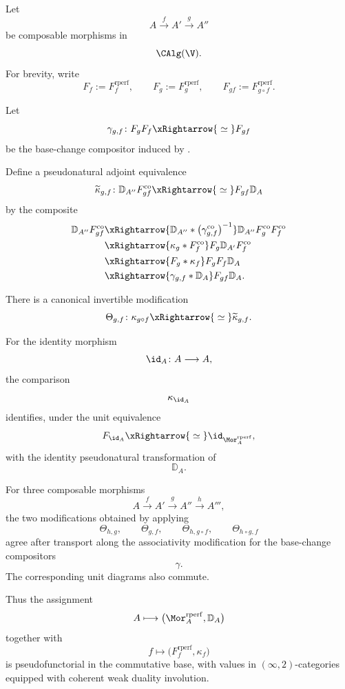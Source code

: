 \begin{proposition}
\label{prop:base-change-morita-duality-composition}
Let
\[
    A
    \xrightarrow{f}
    A'
    \xrightarrow{g}
    A''
\]
be composable morphisms in
\[
    \CAlg(\V).
\]
For brevity, write
\[
    F_f
    :=
    F_f^{\mathrm{rperf}},
    \qquad
    F_g
    :=
    F_g^{\mathrm{rperf}},
    \qquad
    F_{gf}
    :=
    F_{g\circ f}^{\mathrm{rperf}}.
\]

Let
\[
    \gamma_{g,f}
    \colon
    F_gF_f
    \xRightarrow{\;\simeq\;}
    F_{gf}
\]
be the base-change compositor induced by
.

Define a pseudonatural adjoint equivalence
\[
\begin{aligned}
    \widetilde\kappa_{g,f}
    \colon
    \mathbb D_{A''}F_{gf}^{\mathrm{co}}
    \xRightarrow{\;\simeq\;}
    F_{gf}\mathbb D_A
\end{aligned}
\]
by the composite
\[
\begin{aligned}
    \mathbb D_{A''}F_{gf}^{\mathrm{co}}
    &\xRightarrow{
        \mathbb D_{A''}
        \ast
        \bigl(
            \gamma_{g,f}^{\mathrm{co}}
        \bigr)^{-1}
    }
    \mathbb D_{A''}F_g^{\mathrm{co}}F_f^{\mathrm{co}}
    \\
    &\xRightarrow{
        \kappa_g\ast F_f^{\mathrm{co}}
    }
    F_g\mathbb D_{A'}F_f^{\mathrm{co}}
    \\
    &\xRightarrow{
        F_g\ast\kappa_f
    }
    F_gF_f\mathbb D_A
    \\
    &\xRightarrow{
        \gamma_{g,f}\ast\mathbb D_A
    }
    F_{gf}\mathbb D_A.
\end{aligned}
\]

There is a canonical invertible modification
\[
    \Theta_{g,f}
    \colon
    \kappa_{g\circ f}
    \xRightarrow{\;\simeq\;}
    \widetilde\kappa_{g,f}.
\]

For the identity morphism
\[
    \id_A
    \colon
    A
    \longrightarrow
    A,
\]
the comparison
\[
    \kappa_{\id_A}
\]
identifies, under the unit equivalence
\[
    F_{\id_A}
    \xRightarrow{\;\simeq\;}
    \id_{\Mor_A^{\mathrm{rperf}}},
\]
with the identity pseudonatural transformation of
\[
    \mathbb D_A.
\]

For three composable morphisms
\[
    A
    \xrightarrow{f}
    A'
    \xrightarrow{g}
    A''
    \xrightarrow{h}
    A''',
\]
the two modifications obtained by applying
\[
    \Theta_{h,g},
    \qquad
    \Theta_{g,f},
    \qquad
    \Theta_{h,g\circ f},
    \qquad
    \Theta_{h\circ g,f}
\]
agree after transport along the associativity modification for the
base-change compositors
\[
    \gamma.
\]
The corresponding unit diagrams also commute.

Thus the assignment
\[
    A
    \longmapsto
    \bigl(
        \Mor_A^{\mathrm{rperf}},
        \mathbb D_A
    \bigr)
\]
together with
\[
    f
    \longmapsto
    \bigl(
        F_f^{\mathrm{rperf}},
        \kappa_f
    \bigr)
\]
is pseudofunctorial in the commutative base, with values in
$(\infty,2)$-categories equipped with coherent weak duality involution.
\end{proposition}

